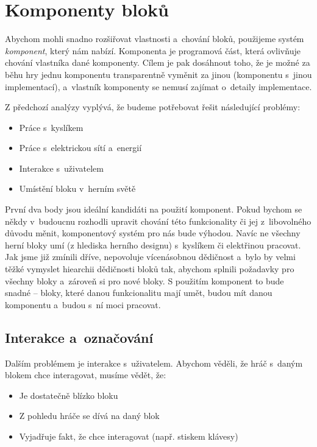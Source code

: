 


\section{Komponenty bloků}

Abychom mohli snadno rozšiřovat vlastnosti a~chování bloků, použijeme systém \textit{komponent}, který nám \UE{} nabízí. Komponenta je programová část, která ovlivňuje chování vlastníka dané komponenty. Cílem je pak dosáhnout toho, že je možné za běhu hry jednu komponentu transparentně vyměnit za jinou (komponentu s~jinou implementací), a~vlastník komponenty se nemusí zajímat o~detaily implementace.

Z předchozí analýzy vyplývá, že budeme potřebovat řešit následující problémy:

\begin{itemize}
	\item Práce s~kyslíkem
	\item Práce s~elektrickou sítí a~energií
	\item Interakce s~uživatelem
	\item Umístění bloku v~herním světě
\end{itemize}


První dva body jsou ideální kandidáti na použití komponent. Pokud bychom se někdy v~budoucnu rozhodli upravit chování této funkcionality či jej z~libovolného důvodu měnit, komponentový systém pro nás bude výhodou. Navíc ne všechny herní bloky umí (z hlediska herního designu) s~kyslíkem či elektřinou pracovat. Jak jsme již zmínili dříve, \UE{} nepovoluje vícenásobnou dědičnost a~bylo by velmi těžké vymyslet hiearchii dědičnosti bloků tak, abychom splnili požadavky pro všechny bloky a~zároveň si  pro nové bloky. S použitím komponent to bude snadné -- bloky, které danou funkcionalitu mají umět, budou mít danou komponentu a~budou s~ní moci pracovat.


\subsection{Interakce a~označování}

Dalším problémem je interakce s~uživatelem. Abychom věděli, že hráč s~daným blokem chce interagovat, musíme vědět, že:
\begin{itemize}
	\item Je dostatečně blízko bloku
	\item Z pohledu hráče se dívá na daný blok 
	\item Vyjadřuje fakt, že chce interagovat (např. stiskem klávesy)
\end{itemize}



